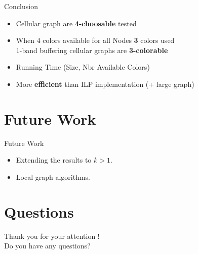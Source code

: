 \documentclass{beamer}
\begin{document}
\begin{frame}{Conclusion}

\begin{block}{}
\begin{itemize}
\item Cellular graph are \textbf{4-choosable} \textrightarrow{} tested
\item When 4 colors available for all Nodes \textrightarrow{} \textbf{3} colors used\\
\textrightarrow{} 1-band buffering cellular graphs are \textbf{3-colorable}
\end{itemize}
 
\end{block}

\vskip 1cm
\pause

\begin{block}{}

\begin{itemize}
\item Running Time (Size, Nbr Available Colors)
\item More \textbf{efficient} than ILP implementation (+ large graph)
\end{itemize}

\end{block}

\end{frame}


\section{Future Work}

\begin{frame}{Future Work}

\begin{itemize}
  \item Extending the results to $k > 1$.
  \vskip 1cm
  \item Local graph algorithms.
\end{itemize}

\end{frame}

\section{Questions}

\begin{frame}
\Huge{Thank you for your attention !\\
Do you have any questions?}
\end{frame}
\end{document}
